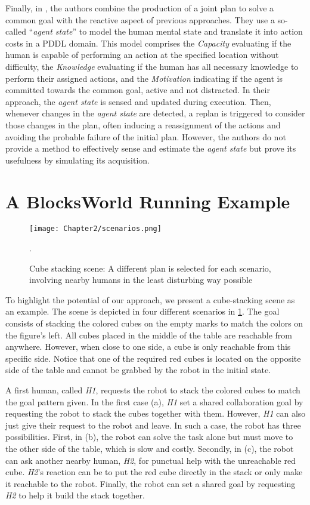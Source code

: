 Finally, in \cite{izquierdo_badiola_improved_2022}, the authors combine the production of a joint plan to solve a common goal with the reactive aspect of previous approaches. 
They use a so-called ``\textit{agent state}'' to model the human mental state and translate it into action costs in a PDDL domain. This model comprises the \textit{Capacity} evaluating if the human is capable of performing an action at the specified location without difficulty, the \textit{Knowledge} evaluating if the human has all necessary knowledge to perform their assigned actions, and the \textit{Motivation} indicating if the agent is committed towards the common goal, active and not distracted. 
In their approach, the \textit{agent state} is sensed and updated during execution. Then, whenever changes in the \textit{agent state} are detected, a replan is triggered to consider those changes in the plan, often inducing a reassignment of the actions and avoiding the probable failure of the initial plan. However, the authors do not provide a method to effectively sense and estimate the \textit{agent state} but prove its usefulness by simulating its acquisition.


\section{A BlocksWorld Running Example}

\begin{figure}
    \centering
    \texttt{[image: Chapter2/scenarios.png]}
    \caption{Cube stacking scene: A different plan is selected for each scenario, involving nearby humans in the least disturbing way possible}.
    \label{fig:scenarios}
\end{figure}

To highlight the potential of our approach, we present a cube-stacking scene as an example. The scene is depicted in four different scenarios in \ref{fig:scenarios}. The goal consists of stacking the colored cubes on the empty marks to match the colors on the figure's left. All cubes placed in the middle of the table are reachable from anywhere. However, when close to one side, a cube is only reachable from this specific side. Notice that one of the required red cubes is located on the opposite side of the table and cannot be grabbed by the robot in the initial state.

A first human, called \textit{H1}, requests the robot to stack the colored cubes to match the goal pattern given. In the first case (a), \textit{H1} set a shared collaboration goal by requesting the robot to stack the cubes together with them. However, \textit{H1} can also just give their request to the robot and leave. In such a case, the robot has three possibilities. First, in (b), the robot can solve the task alone but must move to the other side of the table, which is slow and costly. Secondly, in (c), the robot can ask another nearby human, \textit{H2}, for punctual help with the unreachable red cube. \textit{H2}'s reaction can be to put the red cube directly in the stack or only make it reachable to the robot. Finally, the robot can set a shared goal by requesting \textit{H2} to help it build the stack together. 

